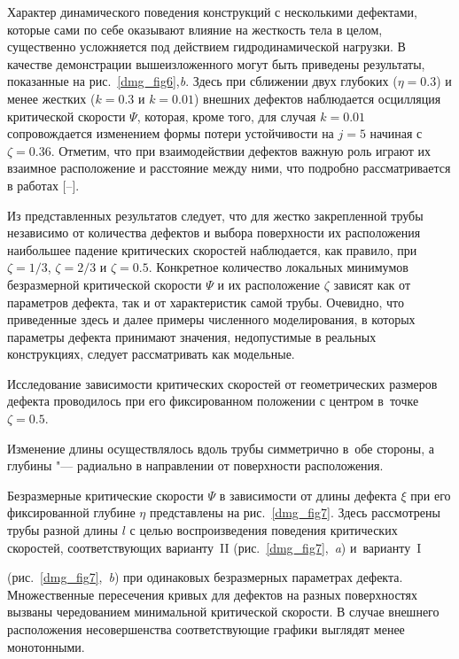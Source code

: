 Характер динамического поведения конструкций с несколькими дефектами, которые сами по себе оказывают влияние на жесткость тела в целом, существенно усложняется под действием гидродинамической нагрузки. В качестве демонстрации вышеизложенного могут быть приведены результаты, показанные на рис.~\ref{dmg_fig6},{\sl b}. Здесь при сближении двух глубоких ($\eta=0.3$) и менее жестких ($k = 0.3$ и $k = 0.01$) внешних дефектов наблюдается осцилляция критической скорости $\Psi$, которая, кроме того, для случая $k = 0.01$ сопровождается изменением формы потери устойчивости на $j = 5$  начиная с $\zeta = 0.36$. Отметим, что при взаимодействии дефектов важную роль играют их взаимное расположение и расстояние между ними, что подробно рассматривается в работах [--].



Из представленных результатов следует, что для жестко закрепленной трубы независимо от количества дефектов и выбора поверхности их расположения наибольшее падение критических скоростей наблюдается, как правило, при $\zeta = 1/3$, $\zeta = 2/3$ и $\zeta = 0.5$. Конкретное количество локальных минимумов безразмерной критической скорости $\Psi$ и их расположение $\zeta$ зависят как от параметров дефекта, так и от характеристик самой трубы. Очевидно, что приведенные здесь и далее примеры численного моделирования, в которых параметры дефекта принимают значения, недопустимые в реальных конструкциях, следует рассматривать как модельные.



Исследование зависимости критических скоростей от геометрических размеров дефекта проводилось при его фиксированном положении с центром в~точке $\zeta = 0.5$. 

Изменение длины осуществлялось вдоль трубы симметрично в~обе стороны, а глубины "--- радиально в направлении от поверхности расположения.



Безразмерные критические скорости $\Psi$ в зависимости от длины дефекта $\xi$ при его фиксированной глубине $\eta$ представлены на рис.~\ref{dmg_fig7}. Здесь рассмотрены трубы разной длины $l$ с целью воспроизведения поведения критических скоростей, соответствующих варианту~II (рис.~\ref{dmg_fig7},~{\sl a}) и~варианту~I 

(рис.~\ref{dmg_fig7},~{\sl b}) при одинаковых безразмерных параметрах дефекта. Множественные пересечения кривых для дефектов на разных поверхностях вызваны чередованием минимальной критической скорости. В случае внешнего расположения несовершенства соответствующие графики выглядят менее монотонными. 

